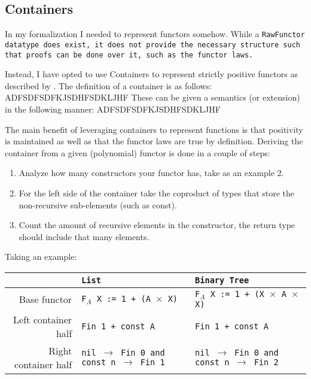 
\subsection{Containers}
In my formalization I needed to represent functors somehow.
While a \tt{RawFunctor} datatype does exist, it does not provide the necessary structure such that proofs can be done over it, such as the functor laws.

Instead, I have opted to use Containers to represent strictly positive functors as described by \cite{Abbott2005}.
The definition of a container is as follows:
ADFSDFSDFKJSDHFSDKLJHF
These can be given a semantics (or extension) in the following manner:
ADFSDFSDFKJSDHFSDKLJHF

The main benefit of leveraging containers to represent functions is that positivity is maintained as well as that the functor laws are true by definition.
Deriving the container from a given (polynomial) functor is done in a couple of steps:
\begin{enumerate}
    \item Analyze how many constructors your functor has, take as an example 2.
    \item For the left side of the container take the coproduct of types that store the non-recursive sub-elements (such as const).
    \item Count the amount of recursive elements in the constructor, the return type should include that many elements.
\end{enumerate}
Taking an example:
\begin{table}[h]
  \begin{tabular}{|r|l|l|}\hline
     & \tt{List} &  \tt{Binary Tree} \\\hline
    Base functor         & \tt{F$_A$ X := 1 + (A $\times$ X)}  & \tt{F$_A$ X := 1 + (X $\times$ A $\times$ X)} \\\hline
    Left container half  & \tt{Fin 1 + const A} & \tt{Fin 1 + const A} \\\hline
    Right container half & \tt{nil $\to$ Fin 0 and const n $\to$ Fin 1} & \tt{nil $\to$ Fin 0 and const n $\to$ Fin 2} \\\hline
  \end{tabular}
\end{table}
